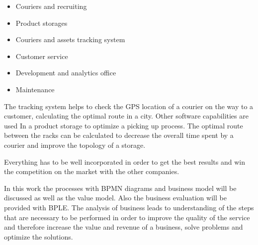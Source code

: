 \begin{itemize}
    \item Couriers and recruiting
    \item Product storages
    \item Couriers and assets tracking system
    \item Customer service
    \item Development and analytics office
    \item Maintenance
\end{itemize}

The tracking system helps to check the GPS location of a courier on the way to a customer, calculating the optimal route in a city. Other software capabilities are used In a product storage to optimize a picking up process. The optimal route between the racks can be calculated to decrease the overall time spent by a courier and improve the topology of a storage.

Everything has to be well incorporated in order to get the best results and win the competition on the market with the other companies.

In this work the processes with BPMN diagrams and business model will be discussed as well as the value model. Also the business evaluation will be provided with BPLE. The analysis of business leads to understanding of the steps that are necessary to be performed in order to improve the quality of the service and therefore increase the value and revenue of a business, solve problems and optimize the solutions.
